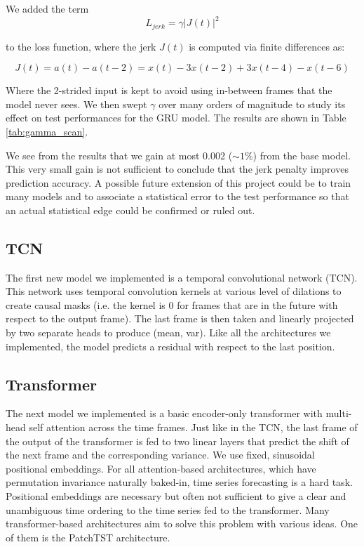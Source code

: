 \documentclass[
reprint,
aps,
prd,
superscriptaddress,
nofootinbib
]{revtex4-2}
\begin{document}
We added the term
\begin{equation}
    L_{jerk} = \gamma |J(t)|^2
\end{equation}

to the loss function, where the jerk $J(t)$ is computed via finite differences as:

\begin{equation}
    J(t) = a(t) - a(t-2) = x(t) - 3x(t-2) + 3x(t-4) - x(t-6)
\end{equation}

Where the 2-strided input is kept to avoid using in-between frames that the model never sees. We then swept $\gamma$ over many orders of magnitude to study its effect on test performances for the GRU model. The results are shown in Table \ref{tab:gamma_scan}.

We see from the results that we gain at most 0.002 ($\sim 1\%$) from the base model. This very small gain is not sufficient to conclude that the jerk penalty improves prediction accuracy. A possible future extension of this project could be to train many models and to associate a statistical error to the test performance so that an actual statistical edge could be confirmed or ruled out.


\subsection{TCN}

The first new model we implemented is a temporal convolutional network (TCN). This network uses temporal convolution kernels at various level of dilations to create causal masks (i.e. the kernel is 0 for frames that are in the future with respect to the output frame). The last frame is then taken and linearly projected by two separate heads to produce (mean, var). Like all the architectures we implemented, the model predicts a residual with respect to the last position.






\subsection{Transformer}

The next model we implemented is a basic encoder-only transformer with multi-head self attention across the time frames. Just like in the TCN, the last frame of the output of the transformer is fed to two linear layers that predict the shift of the next frame and the corresponding variance. We use fixed, sinusoidal positional embeddings. For all attention-based architectures, which have permutation invariance naturally baked-in, time series forecasting is a hard task. Positional embeddings are necessary but often not sufficient to give a clear and unambiguous time ordering to the time series fed to the transformer. Many transformer-based architectures aim to solve this problem with various ideas. One of them is the PatchTST architecture.
\end{document}
